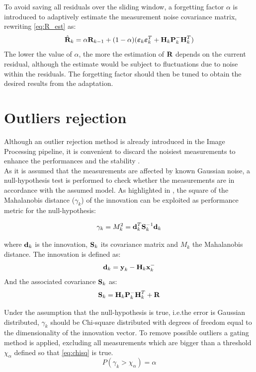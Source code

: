 To avoid saving all residuals over the sliding window, a forgetting factor $\alpha$ is introduced to adaptively estimate the measurement noise covariance matrix, rewriting \cref{eq:R_est} as:
\begin{equation}
\label{eq:R_est1}
    \hat{\mathrm{\textbf{R}}}_k = \alpha\mathrm{\textbf{R}}_{k-1}  + (1-\alpha)(\boldsymbol{\varepsilon}_k \boldsymbol{\varepsilon}_k^T + \mathrm{\textbf{H}}_k \mathrm{\textbf{P}}_k^- \mathrm{\textbf{H}}_k^T)
\end{equation}
The lower the value of $\alpha$, the more the estimation of $\mathrm{\textbf{R}}$ depends on the current residual, although the estimate would be subject to fluctuations due to noise within the residuals. The forgetting factor should then be tuned to obtain the desired results from the adaptation.

\section{Outliers rejection}
Although an outlier rejection method is already introduced in the Image Processing pipeline, it is convenient to discard the noisiest measurements to enhance the performances and the stability \cite{civardi2021small}.\\
As it is assumed that the measurements are affected by known Gaussian noise, a null-hypothesis test is performed to check whether the measurements are in accordance with the assumed model.  As highlighted in \cite{tweddle2015relative}, the square of the Mahalanobis distance ($\gamma_k$) of the innovation can be exploited as performance metric for the null-hypothesis:

\begin{equation}
    \gamma_k = M^2_k = \mathrm{\textbf{d}}_k^T \mathrm{\textbf{S}}_k^{-1} \mathrm{\textbf{d}}_k
\end{equation}

where $\mathrm{\textbf{d}}_k$ is the innovation, $\mathrm{\textbf{S}}_k$ its covariance matrix and $M_k$ the Mahalanobis distance. The innovation is defined as: 
\begin{equation}
    \mathrm{\textbf{d}}_k = \mathrm{\textbf{y}}_k - \mathrm{\textbf{H}}_k \mathrm{\textbf{x}}_k^-
\end{equation}
And the associated covariance $\mathrm{\textbf{S}}_k$ as:
\begin{equation}
    \mathrm{\textbf{S}}_k = \mathrm{\textbf{H}}_k \mathrm{\textbf{P}}_k^- \mathrm{\textbf{H}}_k^T + \mathrm{\textbf{R}}
\end{equation}

Under the assumption that the null-hypothesis is true, i.e.the error is Gaussian distributed, $\gamma_k$ should be Chi-square distributed with degrees of freedom equal to the dimensionality of the innovation vector. 
To remove possible outliers a gating method is applied, excluding all measurements which are bigger than a threshold $\chi_\alpha$ defined so that \cref{eq:chisq} is true.
\begin{equation}
    \label{eq:chisq}
    P(\gamma_k>\chi_\alpha) = \alpha
\end{equation}

